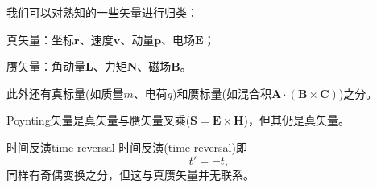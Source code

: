 \begin{corollary}
    我们可以对熟知的一些矢量进行归类：
    \begin{compactitem}
    	\item 真矢量：坐标$\bm r$、速度$\bm v$、动量$\bm p$、电场$\bm E$；
    	\item 赝矢量：角动量$\bm L$、力矩$\bm N$、磁场$\bm B$。
    \end{compactitem}
    此外还有真标量(如质量$m$、电荷$q$)和赝标量(如混合积$\bm A\cdot(\bm B\times\bm C)$)之分。
\end{corollary}

\begin{remark}
    Poynting矢量是真矢量与赝矢量叉乘($\bm S=\bm E\times\bm H$)，但其仍是真矢量。
\end{remark}

\begin{definition}{时间反演}{time reversal}
    时间反演(time reversal)即
    \[
        t'=-t,
    \]
    同样有奇偶变换之分，但这与真赝矢量并无联系。
\end{definition}

